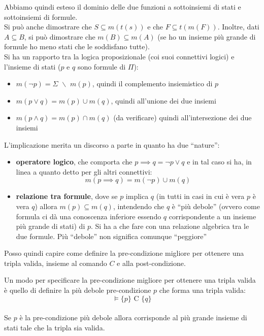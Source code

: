 				      				Abbiamo quindi esteso il dominio delle due funzioni a sottoinsiemi di stati e
				      				sottoinsiemi di formule.\\
				      				Si può anche dimostrare che $S\subseteq m(t(s))$ e che $F\subseteq
				      				t(m(F))$. Inoltre, dati $A\subseteq B$, si può dimostrare che $m(B)\subseteq
				      				m(A)$ (se ho un insieme più grande di formule ho meno stati che le soddisfano
				      				tutte).\\
				      				Si ha un rapporto tra la logica proposizionale (coi suoi connettivi logici) e
				      				l'insieme di stati ($p$ e $q$ sono formule di $\Pi$): 
				      				\begin{itemize}
				      					\item $m(\neg p)=\Sigma \,\,\backslash \,\, m(p)$, quindi il complemento
				      					      insiemistico di $p$
				      					\item $m(p\lor q)=m(p)\cup m(q)$, quindi all'unione dei due insiemi  
				      					\item $m(p\land q)=m(p)\cap m(q)$ (da verificare) quindi all'intersezione dei
				      					      due insiemi
				      				\end{itemize}
				      				L'implicazione merita un discorso a parte in quanto ha due ``nature'':
				      				\begin{itemize}
				      					\item \textbf{operatore logico}, che comporta che $p\implies q= \neg p\lor q$
				      					      e in tal caso si ha, in linea a quanto detto per gli altri connettivi:
				      					      \[m(p\implies q)= m(\neg p)\cup m(q)\]
				      					\item \textbf{relazione tra formule}, dove se $p$ implica $q$ (in tutti in
				      					      casi in cui è vera $p$ è vera $q$) allora
				      					      $m(p)\subseteq m(q)$, intendendo che $q$ è ``più debole'' (ovvero come formula
				      					      ci dà una conoscenza inferiore essendo $q$ corrispondente a un insieme più
				      					      grande di stati) di $p$. Si ha a che
				      					      fare con una relazione algebrica tra le due formule. Più ``debole'' non
				      					      significa comunque ``peggiore''
				      				\end{itemize}
				      				Posso quindi capire come definire la pre-condizione migliore per ottenere una
				      				tripla valida, insieme al comando $C$ e alla post-condizione.\\
				      			    \begin{definizione}
				      			        Un modo per specificare la pre-condizione migliore per ottenere una
				      				tripla valida è quello di definire la più
				      				debole pre-condizione $p$ che forma una tripla valida:
				      				\[\vDash \{p\}\mbox{ C }\{q\}\] \\
				      				Se $p$ è la pre-condizione più debole allora corrisponde al più grande insieme di
				      				stati tale che la tripla sia valida.
				      			    \end{definizione}
